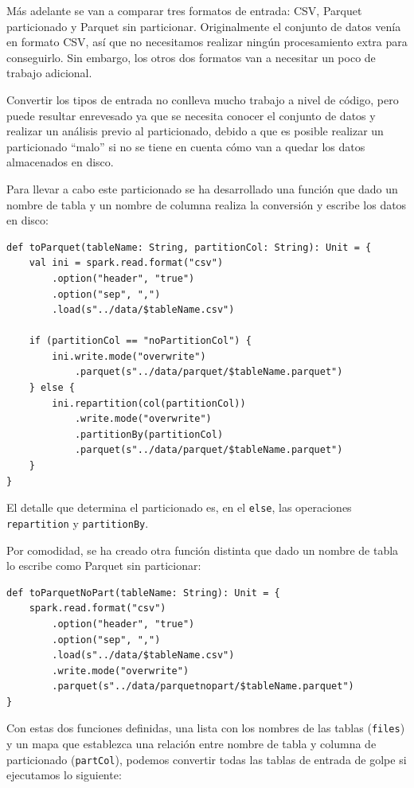 \documentclass[12pt,twoside,titlepage]{report}
\newcommand{\quotes}[1]{``#1''}
\begin{document}
Más adelante se van a comparar tres formatos de entrada: CSV, Parquet particionado y Parquet sin particionar. Originalmente el conjunto de datos venía en formato CSV, así que no necesitamos realizar ningún procesamiento extra para conseguirlo. Sin embargo, los otros dos formatos van a necesitar un poco de trabajo adicional.

Convertir los tipos de entrada no conlleva mucho trabajo a nivel de código, pero puede resultar enrevesado ya que se necesita conocer el conjunto de datos y realizar un análisis previo al particionado, debido a que es posible realizar un particionado \quotes{malo} si no se tiene en cuenta cómo van a quedar los datos almacenados en disco.

Para llevar a cabo este particionado se ha desarrollado una función que dado un nombre de tabla y un nombre de columna realiza la conversión y escribe los datos en disco:

\begin{lstlisting}
def toParquet(tableName: String, partitionCol: String): Unit = {
	val ini = spark.read.format("csv")
		.option("header", "true")
		.option("sep", ",")
		.load(s"../data/$tableName.csv")
		
	if (partitionCol == "noPartitionCol") {
		ini.write.mode("overwrite")
			.parquet(s"../data/parquet/$tableName.parquet")
	} else {
		ini.repartition(col(partitionCol))
			.write.mode("overwrite")
			.partitionBy(partitionCol)
			.parquet(s"../data/parquet/$tableName.parquet")
	}
}
\end{lstlisting}

El detalle que determina el particionado es, en el \texttt{else}, las operaciones \texttt{repartition} y \texttt{partitionBy}.

Por comodidad, se ha creado otra función distinta que dado un nombre de tabla lo escribe como Parquet sin particionar:

\begin{lstlisting}
def toParquetNoPart(tableName: String): Unit = {
	spark.read.format("csv")
		.option("header", "true")
		.option("sep", ",")
		.load(s"../data/$tableName.csv")
		.write.mode("overwrite")
		.parquet(s"../data/parquetnopart/$tableName.parquet")
}
\end{lstlisting}

Con estas dos funciones definidas, una lista con los nombres de las tablas (\texttt{files}) y un mapa que establezca una relación entre nombre de tabla y columna de particionado (\texttt{partCol}), podemos convertir todas las tablas de entrada de golpe si ejecutamos lo siguiente:
\end{document}
